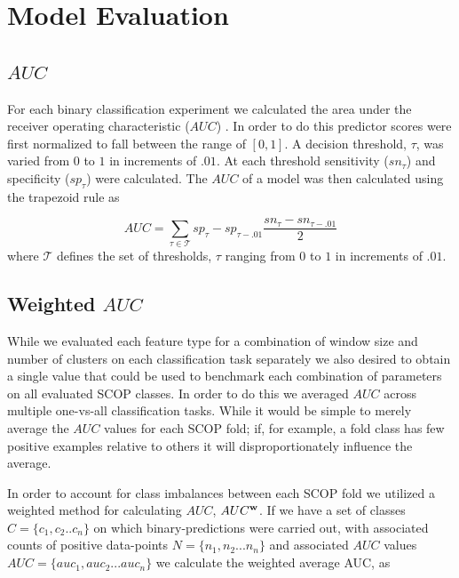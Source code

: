 \section{Model Evaluation}


\subsection{$AUC$ }

For each binary classification experiment we calculated the area under the receiver operating characteristic ($AUC$) .  In order to do this predictor scores were first normalized to fall between the range of $[0,1]$.  A decision threshold, $\tau$, was varied from $0$ to $1$ in increments of $.01$.  At each threshold sensitivity ($sn_{\tau}$) and specificity ($sp_{\tau}$) were calculated.  The $AUC$ of a model was then calculated using the trapezoid rule as 

\[
AUC = \sum_{\tau \in \mathcal{T}} sp_{\tau} - sp_{\tau -.01}  \frac{ sn_{\tau} - sn_{\tau -.01} }{2}
\]
where $\mathcal{T}$ defines the set of thresholds, $\tau$ ranging from $0$ to $1$ in increments of $.01$.

\subsection{Weighted $AUC$ }
\label{sec:vqweightedmetrics}
While we evaluated each feature type for a combination of window size and number of clusters on each classification task separately we also desired to obtain a single value that could be used to benchmark each combination of parameters on all evaluated SCOP classes. In order to do this we averaged $AUC$ across multiple one-vs-all classification tasks. While it would be simple to merely average the $AUC$ values for each SCOP fold; if, for example, a fold class has few positive examples relative to others it will disproportionately influence the average.

In order to account for class imbalances between each SCOP fold we utilized a weighted method for calculating $AUC$, $AUC^{\bf{w}}$.  If we have a set of classes $C=\{c_{1},c_{2}..c_{n}\}$ on which binary-predictions were carried out, with associated counts of positive data-points $N=\{n_{1},n_{2}...n_{n}\}$ and associated $AUC$ values $AUC=\{auc_{1},auc_{2}...auc_{n}\}$ we calculate the weighted average AUC, as 

